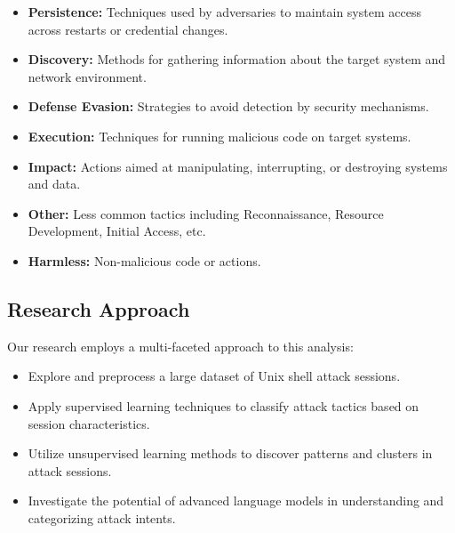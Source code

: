         \begin{itemize}
            \item \textbf{Persistence:} Techniques used by adversaries to maintain system access across restarts or credential changes.
            \item \textbf{Discovery:} Methods for gathering information about the target system and network environment.
            \item \textbf{Defense Evasion:} Strategies to avoid detection by security mechanisms.
            \item \textbf{Execution:} Techniques for running malicious code on target systems.
            \item \textbf{Impact:} Actions aimed at manipulating, interrupting, or destroying systems and data.
            \item \textbf{Other:} Less common tactics including Reconnaissance, Resource Development, Initial Access, etc.
            \item \textbf{Harmless:} Non-malicious code or actions.
        \end{itemize}

    \subsection{Research Approach}
    
        Our research employs a multi-faceted approach to this analysis:

        \begin{itemize}
            \item Explore and preprocess a large dataset of Unix shell attack sessions.
            \item Apply supervised learning techniques to classify attack tactics based on session characteristics.
            \item Utilize unsupervised learning methods to discover patterns and clusters in attack sessions.
            \item Investigate the potential of advanced language models in understanding and categorizing attack intents.
        \end{itemize}

